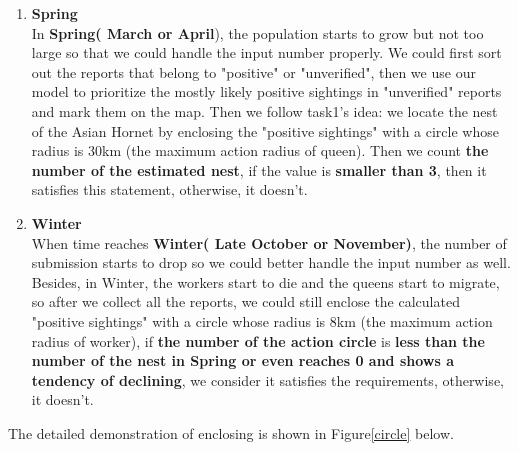 \documentclass{mcmthesis}
\begin{document}
	\begin{enumerate}
		\item \textbf{Spring}\\
			In \textbf{Spring( March or April}), the population starts to grow but not too large so that we could handle the input number properly. We could first sort out the reports that belong to "positive" or "unverified", then we use our model to prioritize the mostly likely positive sightings in "unverified" reports and mark them on the map. Then we follow task1's idea: we locate the nest of the Asian Hornet by enclosing the "positive sightings" with a circle whose radius is 30km (the maximum action radius of queen). Then we count \textbf{the number of the estimated nest}, if the value is \textbf{smaller than 3}, then it satisfies this statement, otherwise, it doesn't.
		\item \textbf{Winter}\\
			When time reaches \textbf{Winter( Late October or November)}, the number of submission starts to drop so we could better handle the input number as well. Besides, in Winter, the workers start to die and the queens start to migrate, so after we collect all the reports, we could still enclose the calculated "positive sightings" with a circle whose radius is 8km (the maximum action radius of worker), if \textbf{the number of the action circle} is \textbf{less than the number of the nest in Spring or even reaches 0 and shows a tendency of declining}, we consider it satisfies the requirements, otherwise, it doesn't. 
	\end{enumerate}
	The detailed demonstration of enclosing is shown in Figure\ref{circle} below.
\end{document}
